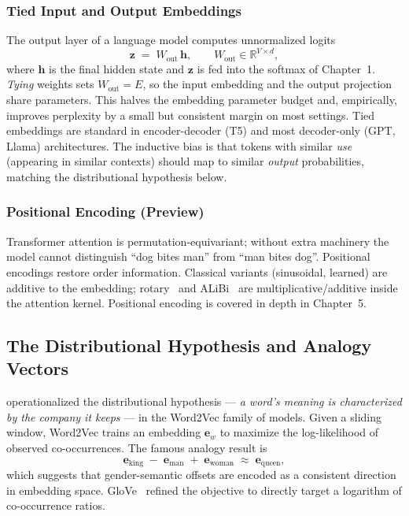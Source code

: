 \subsubsection{Tied Input and Output Embeddings}

The output layer of a language model computes unnormalized logits
\begin{equation}
\label{eq:week3-unembed}
\mathbf{z} \;=\; W_{\mathrm{out}}\,\mathbf{h},
\qquad
W_{\mathrm{out}} \in \mathbb{R}^{V \times d},
\end{equation}
where $\mathbf{h}$ is the final hidden state and $\mathbf{z}$ is fed
into the softmax of Chapter~1. \emph{Tying} weights sets
$W_{\mathrm{out}} = E$, so the input embedding and the output projection
share parameters. This halves the embedding parameter budget and,
empirically, improves perplexity by a small but consistent margin on
most settings. Tied embeddings are standard in encoder-decoder (T5) and
most decoder-only (GPT, Llama) architectures. The inductive bias is
that tokens with similar \emph{use} (appearing in similar contexts)
should map to similar \emph{output} probabilities, matching the
distributional hypothesis below.

\subsubsection{Positional Encoding (Preview)}

Transformer attention is permutation-equivariant; without extra
machinery the model cannot distinguish ``dog bites man'' from
``man bites dog''. Positional encodings restore order information.
Classical variants (sinusoidal, learned) are additive to the embedding;
rotary~\citep{su2021rope} and ALiBi~\citep{press2022alibi} are
multiplicative/additive inside the attention kernel. Positional
encoding is covered in depth in Chapter~5.

\subsection{The Distributional Hypothesis and Analogy Vectors}

\citet{mikolov2013efficient,mikolov2013distributed} operationalized the
distributional hypothesis — \emph{a word's meaning is characterized by
the company it keeps} — in the Word2Vec family of models. Given a
sliding window, Word2Vec trains an embedding $\mathbf{e}_w$ to
maximize the log-likelihood of observed co-occurrences. The
famous analogy result is
\begin{equation}
\mathbf{e}_{\text{king}} \;-\; \mathbf{e}_{\text{man}}
\;+\; \mathbf{e}_{\text{woman}}
\;\approx\; \mathbf{e}_{\text{queen}},
\end{equation}
which suggests that gender-semantic offsets are encoded as a
consistent direction in embedding space. GloVe~\citep{pennington2014glove}
refined the objective to directly target a logarithm of co-occurrence
ratios.

